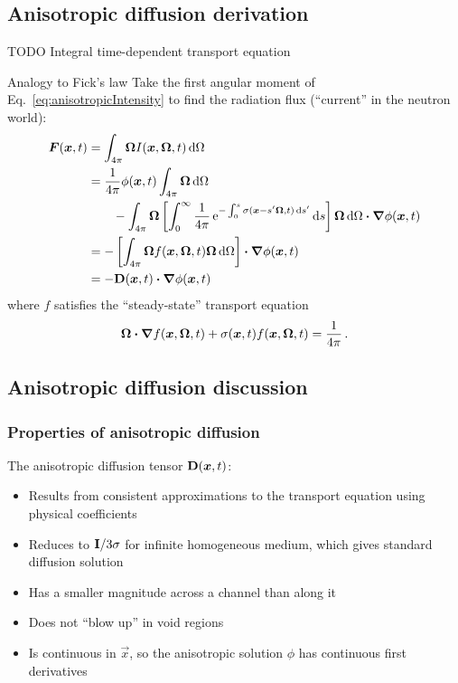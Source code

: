 \documentclass{beamer}
\begin{document}
\subsection{Anisotropic diffusion derivation}
\begin{frame}
  TODO
  Integral time-dependent transport equation \cite{Pri2010}
\end{frame}

\begin{frame}{Analogy to Fick's law}
  Take the first angular moment of Eq.~\eqref{eq:anisotropicIntensity} to find
  the radiation flux (``current'' in the neutron world):
\begin{align*}
  \bm{F}(\bm{x}, t) &= \int_{4\pi} \bm{\Omega} I(\bm{x}, \bm{\Omega}, t) \mathop{}\!\mathrm{d} \Omega
  \\
  &=
  \frac{1}{4\pi}\phi(\bm{x}, t) \int_{4\pi} \bm{\Omega} \mathop{}\!\mathrm{d} \Omega
  \\
  &\qquad-  \int_{4\pi} \bm{\Omega} \left[ \int_{0}^{\infty} \frac{1}{4\pi}
  \mathop{}\!\mathrm{e}^{- \int_{0}^{s} \sigma(\bm{x}-s'\bm{\Omega}, t)
  \mathop{}\!\mathrm{d} s'} \mathop{}\!\mathrm{d} s\right]
\bm{\Omega}  \mathop{}\!\mathrm{d} \Omega \bm{\cdot} \bm{\nabla} \phi(\bm{x}, t)
\\
&= - \left[ \int_{4\pi} \bm{\Omega} f(\bm{x},\bm{\Omega},t)
\bm{\Omega}  \mathop{}\!\mathrm{d} \Omega \right] \bm{\cdot} \bm{\nabla} \phi(\bm{x}, t)
\\
&= - \mathbf{D}(\bm{x},t) \bm{\cdot} \bm{\nabla} \phi(\bm{x}, t)
\end{align*}
where $f$ satisfies the ``steady-state'' transport equation
\begin{equation} \label{eq:dcoeffTransportEquation}
  \bm{\Omega}\bm{\cdot} \bm{\nabla} f(\bm{x},\bm{\Omega},t) + \sigma(\bm{x},t) f(\bm{x},\bm{\Omega},t) =
  \frac{1}{4\pi}\,.
\end{equation}
\end{frame}

\subsection{Anisotropic diffusion discussion}
\begin{frame}
  \frametitle{Properties of anisotropic diffusion}

  The anisotropic diffusion tensor $\mathbf{D}(\bm{x},t)$: 
  \begin{itemize}
    \item Results from consistent approximations to the transport equation
      using physical coefficients
    \item Reduces to $\mathbf{I}/3\sigma$ for infinite homogeneous
      medium, which gives standard diffusion solution
    \item Has a smaller magnitude across a channel than along it
    \item Does not ``blow up'' in void regions
    \item Is continuous in $\vec{x}$, so the anisotropic solution $\phi$
      has continuous first derivatives
  \end{itemize}
\end{frame}
\end{document}
